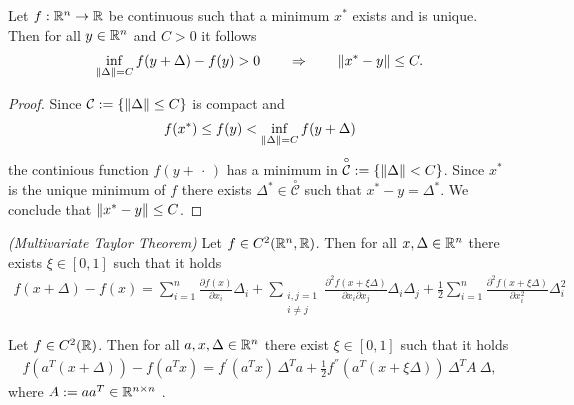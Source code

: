 \begin{proposition}
  Let 
  $f : \mathbb{R}^n \to \mathbb{R}$ 
  be continuous such that 
  a minimum $x^*$ exists and is unique.
  Then 
  for all $y \in \mathbb{R}^n$ and $C>0$ 
  it follows
    \begin{gather}
      \inf_{\left\lVert\Delta\right\rVert=C} f(y+\Delta) - f(y) > 0 \qquad
      \Rightarrow \qquad 
      \left\lVert x^* - y\right\rVert \le C.
    \end{gather}
\end{proposition}


\begin{proof}
Since 
$\mathcal{C}:=\left\{ \left\lVert\Delta\right\rVert\le C \right\}$
is compact and
\begin{gather*}
  f(x^*) \le f(y) <  \inf_{\left\lVert\Delta\right\rVert=C} f(y+\Delta)
\end{gather*}
the continious function $f(y+\,\cdot\,)$ has a minimum in 
$\overset{\circ}{\mathcal{C}}:=\left\{ \left\lVert\Delta\right\rVert < C \right\}$. 
Since 
$x^*$ is the unique minimum of $f$
there exists $\Delta^* \in \overset{\circ}{\mathcal{C}}$ 
such that 
$x^* - y = \Delta^*$.
We conclude that
$\left\lVert x^* - y\right\rVert \le C$.
\end{proof}



\begin{theorem}
  \emph{(Multivariate Taylor Theorem)}
  Let 
  $f \in C^2(\mathbb{R}^n, \mathbb{R})$.
  Then 
  for all $x, \Delta \in \mathbb{R}^n$
  there exists $\xi \in [0,1]$
  such that 
  it holds
  \begin{gather}
    \label{syu_taylor}
    f(x + \Delta) - f(x)
    =
    \sum_{i = 1}^{n} \frac{\partial f(x)}{\partial x_i} \Delta_i    
    + 
    \sum_{
    \begin{smallmatrix}
      i,j = 1 \\ 
      i \neq j
    \end{smallmatrix}
    }
    \frac{\partial^2 f(x + \xi \Delta)}{\partial x_i \partial x_j} \Delta_i\Delta_j
    + \frac{1}{2}\sum_{i = 1}^{n} \frac{\partial^2 f(x + \xi \Delta)}{\partial x_i^2}\Delta_i^2 
  \end{gather}
\end{theorem}


\begin{corollary}
  Let 
  $f\in C^2(\mathbb{R})$. 
  Then
  for all $a,x,\Delta \in \mathbb{R}^n$ 
  there exist $\xi \in [0,1]$ 
  such that it holds
  \begin{gather}
    \label{syu_2.result}
    f(a^T (x + \Delta)) - f(a^T x) = 
    f^{'}(a^T x)\, \Delta^T a + 
    \frac{1}{2}f^{''}(a^T (x + \xi \Delta))\, \Delta^T A\ \Delta,
  \end{gather}
  where 
  $A:= a a^T \in \mathbb{R}^{n \times n}$ .
\end{corollary}

